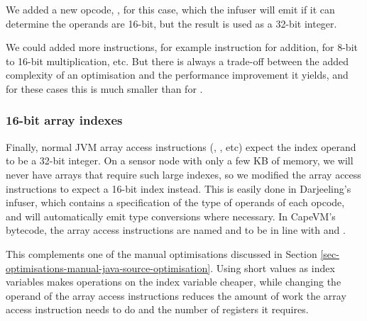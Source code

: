 We added a new opcode, , for this case, which the infuser will emit if it can determine the operands are 16-bit, but the result is used as a 32-bit integer.

We could added more instructions, for example  instruction for addition,  for 8-bit to 16-bit multiplication, etc. But there is always a trade-off between the added complexity of an optimisation and the performance improvement it yields, and for these cases this is much smaller than for .

\subsubsection{16-bit array indexes}
Finally, normal JVM array access instructions (, , etc) expect the index operand to be a 32-bit integer. On a sensor node with only a few KB of memory, we will never have arrays that require such large indexes, so we modified the array access instructions to expect a 16-bit index instead. This is easily done in Darjeeling's infuser, which contains a specification of the type of operands of each opcode, and will automatically emit type conversions where necessary. In CapeVM's bytecode, the array access instructions are named  and  to be in line with  and .

This complements one of the manual optimisations discussed in Section \ref{sec-optimisations-manual-java-source-optimisation}. Using short values as index variables makes operations on the index variable cheaper, while changing the operand of the array access instructions reduces the amount of work the array access instruction needs to do and the number of registers it requires.

